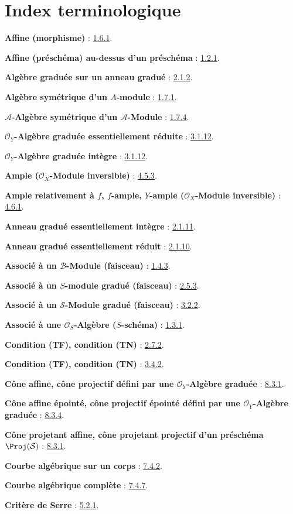 \thispagestyle{plain}
{}
\section*{Index terminologique}

\begingroup
\small
\setlength{\parindent}{0pt}
\setlength{\parskip}{2pt}
\newcommand{\egaTerme}[2]{\textbf{#1} : #2.\par}

\egaTerme{Affine (morphisme)}{\hyperref[II.1.6.1-fr]{1.6.1}}
\egaTerme{Affine (préschéma) au-dessus d'un préschéma}{\hyperref[II.1.2.1-fr]{1.2.1}}
\egaTerme{Algèbre graduée sur un anneau gradué}{\hyperref[II.2.1.2-fr]{2.1.2}}
\egaTerme{Algèbre symétrique d'un $A$-module}{\hyperref[II.1.7.1-fr]{1.7.1}}
\egaTerme{$\mathcal{A}$-Algèbre symétrique d'un $\mathcal{A}$-Module}{\hyperref[II.1.7.4-fr]{1.7.4}}
\egaTerme{$\mathcal{O}_Y$-Algèbre graduée essentiellement réduite}{\hyperref[II.3.1.12-fr]{3.1.12}}
\egaTerme{$\mathcal{O}_Y$-Algèbre graduée intègre}{\hyperref[II.3.1.12-fr]{3.1.12}}
\egaTerme{Ample ($\mathcal{O}_X$-Module inversible)}{\hyperref[II.4.5.3-fr]{4.5.3}}
\egaTerme{Ample relativement à $f$, $f$-ample, $Y$-ample ($\mathcal{O}_X$-Module inversible)}{\hyperref[II.4.6.1-fr]{4.6.1}}
\egaTerme{Anneau gradué essentiellement intègre}{\hyperref[II.2.1.11-fr]{2.1.11}}
\egaTerme{Anneau gradué essentiellement réduit}{\hyperref[II.2.1.10-fr]{2.1.10}}
\egaTerme{Associé à un $\mathcal{B}$-Module (faisceau)}{\hyperref[II.1.4.3-fr]{1.4.3}}
\egaTerme{Associé à un $S$-module gradué (faisceau)}{\hyperref[II.2.5.3-fr]{2.5.3}}
\egaTerme{Associé à un $\mathcal{S}$-Module gradué (faisceau)}{\hyperref[II.3.2.2-fr]{3.2.2}}
\egaTerme{Associé à une $\mathcal{O}_S$-Algèbre ($S$-schéma)}{\hyperref[II.1.3.1-fr]{1.3.1}}

\egaTerme{Condition (TF), condition (TN)}{\hyperref[II.2.7.2-fr]{2.7.2}}
\egaTerme{Condition (TF), condition (TN)}{\hyperref[II.3.4.2-fr]{3.4.2}}
\egaTerme{Cône affine, cône projectif défini par une $\mathcal{O}_Y$-Algèbre graduée}{\hyperref[II.8.3.1-fr]{8.3.1}}
\egaTerme{Cône affine épointé, cône projectif épointé défini par une $\mathcal{O}_Y$-Algèbre graduée}{\hyperref[II.8.3.4-fr]{8.3.4}}
\egaTerme{Cône projetant affine, cône projetant projectif d'un préschéma $\Proj(\mathcal{S})$}{\hyperref[II.8.3.1-fr]{8.3.1}}
\egaTerme{Courbe algébrique sur un corps}{\hyperref[II.7.4.2-fr]{7.4.2}}
\egaTerme{Courbe algébrique complète}{\hyperref[II.7.4.7-fr]{7.4.7}}
\egaTerme{Critère de Serre}{\hyperref[II.5.2.1-fr]{5.2.1}}


